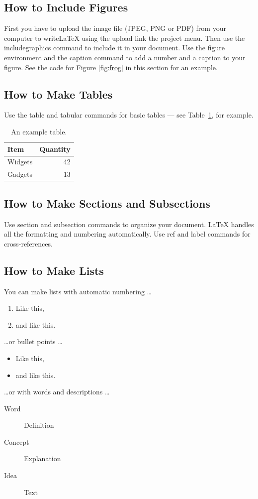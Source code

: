 \documentclass[a4paper]{report}
\begin{document}
    \subsection{How to Include Figures}    
    First you have to upload the image file (JPEG, PNG or PDF) from your computer to writeLaTeX using the upload link the project menu. Then use the includegraphics command to include it in your document. Use the figure environment and the caption command to add a number and a caption to your figure. See the code for Figure \ref{fig:frog} in this section for an example.            
    \subsection{How to Make Tables}    
    Use the table and tabular commands for basic tables --- see Table~\ref{tab:widgets}, for example.    
    \begin{table}
    \centering
    \begin{tabular}{l|r}
    Item & Quantity \\\hline
    Widgets & 42 \\
    Gadgets & 13
    \end{tabular}
    \caption{\label{tab:widgets}An example table.}
    \end{table}    
    \subsection{How to Make Sections and Subsections}
    
    Use section and subsection commands to organize your document. \LaTeX{} handles all the formatting and numbering automatically. Use ref and label commands for cross-references.
    
    \subsection{How to Make Lists}
    
    You can make lists with automatic numbering \dots
    
    \begin{enumerate}
    \item Like this,
    \item and like this.
    \end{enumerate}
    \dots or bullet points \dots
    \begin{itemize}
    \item Like this,
    \item and like this.
    \end{itemize}
    \dots or with words and descriptions \dots
    \begin{description}
    \item[Word] Definition
    \item[Concept] Explanation
    \item[Idea] Text
    \end{description}
    
\end{document}
